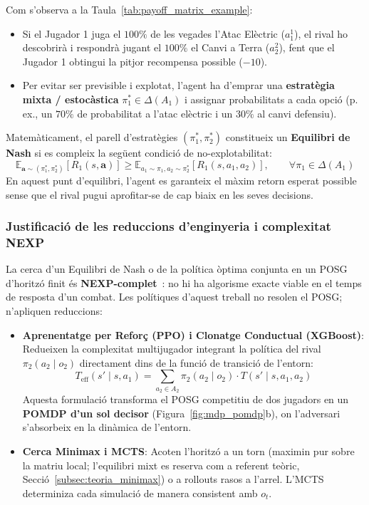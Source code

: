 Com s'observa a la Taula~\ref{tab:payoff_matrix_example}:
\begin{itemize}
    \item Si el Jugador 1 juga el $100\%$ de les vegades l'Atac Elèctric ($a_1^1$), el rival ho descobrirà i respondrà jugant el $100\%$ el Canvi a Terra ($a_2^2$), fent que el Jugador 1 obtingui la pitjor recompensa possible ($-10$).
    \item Per evitar ser previsible i explotat, l'agent ha d'emprar una \textbf{estratègia mixta / estocàstica} $\pi_1^* \in \Delta(A_1)$ i assignar probabilitats a cada opció (p. ex., un $70\%$ de probabilitat a l'atac elèctric i un $30\%$ al canvi defensiu).
\end{itemize}

Matemàticament, el parell d'estratègies $(\pi_1^*, \pi_2^*)$ constitueix un \textbf{Equilibri de Nash} si es compleix la següent condició de no-explotabilitat:
\begin{equation}
    \mathbb{E}_{\mathbf{a} \sim (\pi_1^*, \pi_2^*)} [R_1(s, \mathbf{a})] \ge \mathbb{E}_{a_1 \sim \pi_1, a_2 \sim \pi_2^*} [R_1(s, a_1, a_2)], \qquad \forall \pi_1 \in \Delta(A_1)
    \label{eq:nash_equilibrium}
\end{equation}
En aquest punt d'equilibri, l'agent es garanteix el màxim retorn esperat possible sense que el rival pugui aprofitar-se de cap biaix en les seves decisions.

\subsubsection{Justificació de les reduccions d'enginyeria i complexitat NEXP}

La cerca d'un Equilibri de Nash o de la política òptima conjunta en un POSG d'horitzó finit és \textbf{NEXP-complet}~\cite{bernstein_nexp_2002}: no hi ha algorisme exacte viable en el temps de resposta d'un combat. Les polítiques d'aquest treball no resolen el POSG; n'apliquen reduccions:
\begin{itemize}
    \item \textbf{Aprenentatge per Reforç (PPO) i Clonatge Conductual (XGBoost)}: Redueixen la complexitat multijugador integrant la política del rival $\pi_2(a_2 \mid o_2)$ directament dins de la funció de transició de l'entorn:
          \begin{equation}
              T_{\mathrm{eff}}(s'\mid s, a_1) = \sum_{a_2 \in A_2} \pi_2(a_2 \mid o_2) \cdot T(s'\mid s, a_1, a_2)
              \label{eq:eff_transition}
          \end{equation}
          Aquesta formulació transforma el POSG competitiu de dos jugadors en un \textbf{POMDP d'un sol decisor} (Figura~\ref{fig:mdp_pomdp}b), on l'adversari s'absorbeix en la dinàmica de l'entorn.
    \item \textbf{Cerca Minimax i MCTS}: Acoten l'horitzó a un torn (maximin pur sobre la matriu local; l'equilibri mixt es reserva com a referent teòric, Secció~\ref{subsec:teoria_minimax}) o a rollouts rasos a l'arrel. L'MCTS determiniza cada simulació de manera consistent amb $o_t$.
\end{itemize}


